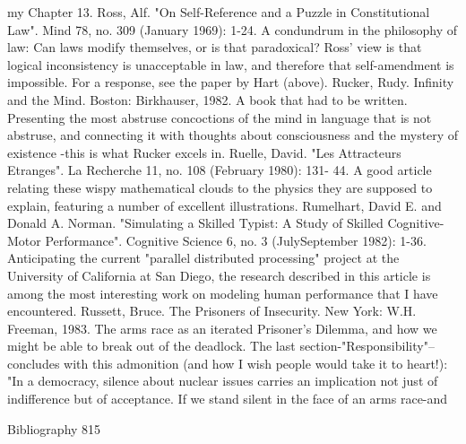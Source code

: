  my Chapter 13.
Ross, Alf. "On Self-Reference and a Puzzle in Constitutional Law". Mind 78, no. 309
 (January 1969): 1-24. A condundrum in the philosophy of law: Can laws modify
 themselves, or is that paradoxical? Ross' view is that logical inconsistency is unacceptable
 in law, and therefore that self-amendment is impossible. For a response, see the paper by
 Hart (above).
Rucker, Rudy. Infinity and the Mind. Boston: Birkhauser, 1982. A book that had to be
 written. Presenting the most abstruse concoctions of the mind in language that is not
 abstruse, and connecting it with thoughts about consciousness and the mystery of existence
 -this is what Rucker excels in.
Ruelle, David. "Les Attracteurs Etranges". La Recherche 11, no. 108 (February 1980): 131-
 44. A good article relating these wispy mathematical clouds to the physics they are
 supposed to explain, featuring a number of excellent illustrations.
Rumelhart, David E. and Donald A. Norman. "Simulating a Skilled Typist: A Study of
 Skilled Cognitive-Motor Performance". Cognitive Science 6, no. 3 (JulySeptember 1982):
 1-36. Anticipating the current "parallel distributed processing" project at the University of
 California at San Diego, the research described in this article is among the most interesting
 work on modeling human performance that I have encountered.
Russett, Bruce. The Prisoners of Insecurity. New York: W.H. Freeman, 1983. The arms race
 as an iterated Prisoner's Dilemma, and how we might be able to break out of the deadlock.
 The last section-"Responsibility"--concludes with this admonition (and how I wish people
 would take it to heart!): "In a democracy, silence about nuclear issues carries an implication
 not just of indifference but of acceptance. If we stand silent in the face of an arms race-and

Bibliography                                                                               815


